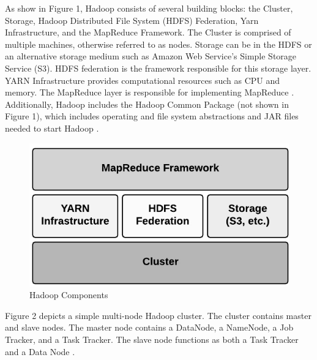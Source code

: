 \documentclass[9pt,twocolumn,twoside]{../../styles/osajnl}
\begin{document}
As show in Figure 1, Hadoop consists of several building blocks: the Cluster, Storage, Hadoop Distributed File System (HDFS) Federation, Yarn Infrastructure, and the MapReduce Framework.  The Cluster is comprised of multiple machines, otherwise referred to as nodes.  Storage can be in the HDFS or an alternative storage medium such as Amazon Web Service's Simple Storage Service (S3).  HDFS federation is the framework responsible for this storage layer.  YARN Infrastructure provides computational resources such as CPU and memory. The MapReduce layer is responsible for implementing MapReduce \cite{www-hadooparch2}. Additionally, Hadoop includes the Hadoop Common Package (not shown in Figure 1), which includes operating and file system abstractions and JAR files needed to start Hadoop \cite{www-wikihadoop}.


\begin{figure}[ht]
  \includegraphics[scale=1.00]{images/hadoop-architecture2.jpg}
  \caption{Hadoop Components \cite{www-hadooparch2}}
\end{figure}

Figure 2 depicts a simple multi-node Hadoop cluster. The cluster contains master and slave nodes.  The master node contains a DataNode, a NameNode, a Job Tracker, and a Task Tracker. The slave node functions as both a Task Tracker and a Data Node \cite{www-hadooparch2}.
\end{document}
